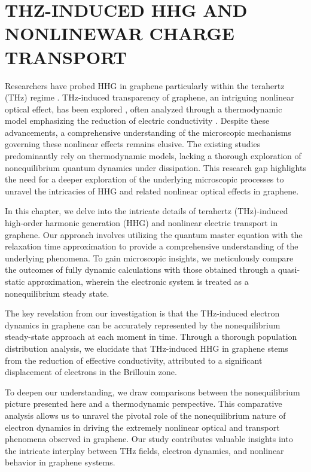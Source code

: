 \chapter{THZ-INDUCED HHG AND NONLINEWAR CHARGE TRANSPORT \label{ch:ch4}}

Researchers have probed HHG in graphene particularly within the terahertz (THz) regime \cite{hafez2018extremely,kovalev2021electrical}. THz-induced transparency of graphene, an intriguing nonlinear optical effect, has been explored \cite{Hwang2013,Paul_2013,doi:10.1063/1.4902999}, often analyzed through a thermodynamic model emphasizing the reduction of electric conductivity \cite{mics2015thermodynamic,kovalev2021electrical}.
Despite these advancements, a comprehensive understanding of the microscopic mechanisms governing these nonlinear effects remains elusive. The existing studies predominantly rely on thermodynamic models, lacking a thorough exploration of nonequilibrium quantum dynamics under dissipation. This research gap highlights the need for a deeper exploration of the underlying microscopic processes to unravel the intricacies of HHG and related nonlinear optical effects in graphene.

In this chapter, we delve into the intricate details of terahertz (THz)-induced high-order harmonic generation (HHG) and nonlinear electric transport in graphene. Our approach involves utilizing the quantum master equation with the relaxation time approximation to provide a comprehensive understanding of the underlying phenomena. To gain microscopic insights, we meticulously compare the outcomes of fully dynamic calculations with those obtained through a quasi-static approximation, wherein the electronic system is treated as a nonequilibrium steady state.

The key revelation from our investigation is that the THz-induced electron dynamics in graphene can be accurately represented by the nonequilibrium steady-state approach at each moment in time. Through a thorough population distribution analysis, we elucidate that THz-induced HHG in graphene stems from the reduction of effective conductivity, attributed to a significant displacement of electrons in the Brillouin zone.

To deepen our understanding, we draw comparisons between the nonequilibrium picture presented here and a thermodynamic perspective. This comparative analysis allows us to unravel the pivotal role of the nonequilibrium nature of electron dynamics in driving the extremely nonlinear optical and transport phenomena observed in graphene. Our study contributes valuable insights into the intricate interplay between THz fields, electron dynamics, and nonlinear behavior in graphene systems.

